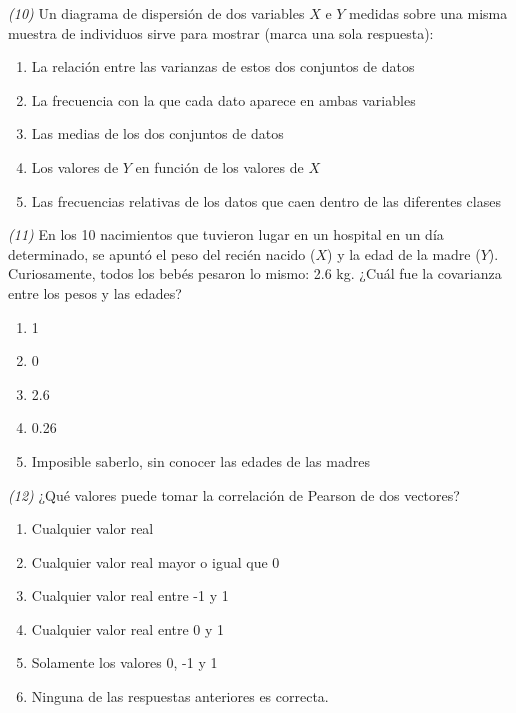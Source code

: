 \documentclass[
]{book}
\providecommand{\tightlist}{%
  \setlength{\itemsep}{0pt}\setlength{\parskip}{0pt}}
\theoremstyle{definition}
\theoremstyle{definition}
\theoremstyle{definition}
\theoremstyle{definition}
\theoremstyle{remark}
\begin{document}
\emph{(10)} Un diagrama de dispersión de dos variables \(X\) e \(Y\) medidas sobre una misma muestra de individuos sirve para mostrar (marca una sola respuesta):

\begin{enumerate}
\def\labelenumi{\arabic{enumi}.}
\tightlist
\item
  La relación entre las varianzas de estos dos conjuntos de datos
\item
  La frecuencia con la que cada dato aparece en ambas variables
\item
  Las medias de los dos conjuntos de datos
\item
  Los valores de \(Y\) en función de los valores de \(X\)
\item
  Las frecuencias relativas de los datos que caen dentro de las diferentes clases
\end{enumerate}

\emph{(11)} En los 10 nacimientos que tuvieron lugar en un hospital en un día determinado, se apuntó el peso del recién nacido (\(X\)) y la edad de la madre (\(Y\)). Curiosamente, todos los bebés pesaron lo mismo: 2.6 kg. ¿Cuál fue la covarianza entre los pesos y las edades?

\begin{enumerate}
\def\labelenumi{\arabic{enumi}.}
\tightlist
\item
  1
\item
  0\\
\item
  2.6
\item
  0.26
\item
  Imposible saberlo, sin conocer las edades de las madres
\end{enumerate}

\emph{(12)} ¿Qué valores puede tomar la correlación de Pearson de dos vectores?

\begin{enumerate}
\def\labelenumi{\arabic{enumi}.}
\tightlist
\item
  Cualquier valor real
\item
  Cualquier valor real mayor o igual que 0
\item
  Cualquier valor real entre -1 y 1
\item
  Cualquier valor real entre 0 y 1
\item
  Solamente los valores 0, -1 y 1
\item
  Ninguna de las respuestas anteriores es correcta.
\end{enumerate}
\end{document}
